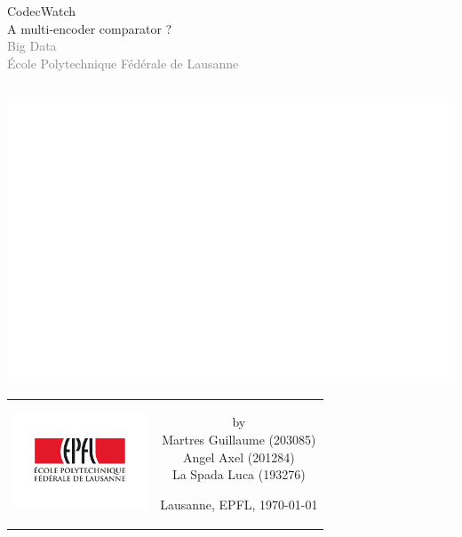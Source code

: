 \begin{titlepage}
\begin{center}
\sffamily


\null\vspace{2cm}
{\Huge CodecWatch \\[12pt] A multi-encoder comparator ?} \\[24pt]
\textcolor{gray}{\small{Big Data \\ École Polytechnique Fédérale de Lausanne}}

\hbox{\hspace{-20ex}
\includegraphics[width=19.5cm]{figures/White}}

\vfill

\begin{tabular} {cc}
\parbox{0.3\textwidth}{\includegraphics[width=4cm]{figures/epfl}}
&
\parbox{0.7\textwidth}{%
	by \\ [4pt]
	\hspace{3em} Martres Guillaume (203085)\\
	\hspace{3em} Angel Axel (201284)\\
	\hspace{3em} La Spada Luca (193276)\\[9pt]
\small

Lausanne, EPFL, \today}
\end{tabular}
\end{center}
\vspace{2cm}
\end{titlepage}
